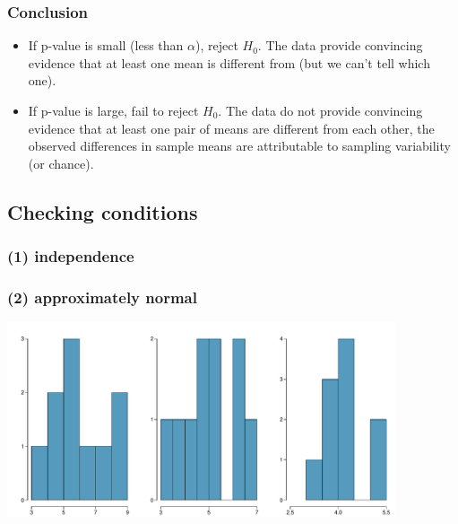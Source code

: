 \documentclass[notes,11pt, aspectratio=169]{beamer}
\begin{document}

\begin{frame}
\frametitle{Conclusion}

\begin{itemize}

\item  If p-value is small (less than $\alpha$), reject $H_0$. The data provide convincing evidence that at least one mean is different from (but we can't tell which one).

\pause

\item If p-value is large, fail to reject $H_0$. The data do not provide convincing evidence that at least one pair of means are different from each other, the observed differences in sample means are attributable to sampling variability (or chance).

\end{itemize}

\end{frame}


\subsection{Checking conditions}


\begin{frame}[fragile]
\frametitle{(1) independence}



\end{frame}


\begin{frame}[fragile]
\frametitle{(2) approximately normal}


\begin{center}
\includegraphics[width=0.86\textwidth]{graphs/normal}
\end{center}

\end{frame}
\end{document}
